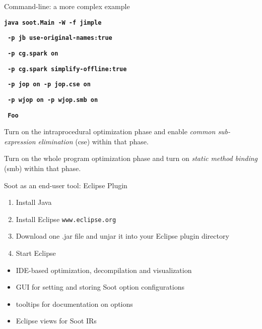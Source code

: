 \begin{slide}{Command-line: a more complex example}

\begin{small}
\textbf{\texttt{java soot.Main -W -f jimple}}

\textbf{\texttt{     -p jb use-original-names:true }}

\textbf{\texttt{     -p cg.spark on }}

\textbf{\texttt{     -p cg.spark simplify-offline:true}}

\textbf{\red\texttt{     -p jop on -p jop.cse on   }}

\textbf{\red\texttt{     -p wjop on  -p wjop.smb on }}

\textbf{\texttt{     Foo }}
\end{small}

\vspace{.2in}

\begin{footnotesize}
Turn on 
the intraprocedural optimization phase and enable 
\textit{common sub-expression elimination} (cse) within that phase.

Turn on the whole program optimization phase and
turn on \textit{static method binding} (smb) within that phase.
\end{footnotesize}

\end{slide}

\begin{slide}{Soot as an end-user tool:  Eclipse Plugin}
\vspace{-0.1in}
\begin{small}
\begin{enumerate}
\item Install Java
\item Install Eclipse {\tt www.eclipse.org}
\item Download one .jar file and unjar it into your Eclipse plugin directory 
\item Start Eclipse 
\end{enumerate}

\begin{itemize}
\item IDE-based optimization, decompilation and visualization
\item GUI for setting and storing Soot option configurations
\item tooltips for documentation on options
\item Eclipse views for Soot IRs
\end{itemize}
\end{small}
\end{slide}


